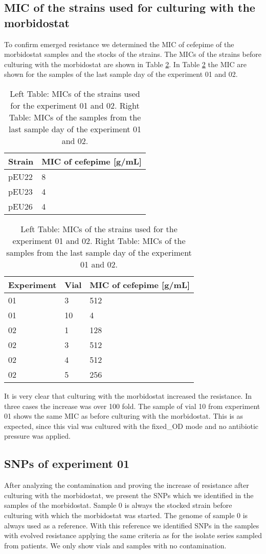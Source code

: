 \subsection{MIC of the strains used for culturing with the morbidostat}
To confirm emerged resistance we determined the MIC of cefepime of the morbidostat samples and the stocks of the strains.
The MICs of the strains before culturing with the morbidostat are shown in Table \ref{table:mics_finish}. In Table \ref{table:mics_finish} the MIC are shown for the samples of the last sample day of the experiment 01 and 02. 
\begin{table}[H]
	\begin{tabular}{|ll|}
		\hline
		Strain & MIC of cefepime [\textmu g/mL] \\ \hline
		pEU22  & 8   \\ \hline
		pEU23  & 4   \\ \hline
		pEU26  & 4   \\ \hline
	\end{tabular}
	\quad
	\begin{tabular}{|lll|}
		\hline
		Experiment & Vial & MIC of cefepime [\textmu g/mL] \\ \hline
		01         & 3    & 512                            \\ \hline
		01         & 10   & 4                              \\ \hline
		02         & 1    & 128                            \\ \hline
		02         & 3    & 512                            \\ \hline
		02         & 4    & 512                            \\ \hline
		02         & 5    & 256                            \\ \hline
	\end{tabular}
	\label{table:mics_finish}
	\caption{Left Table: MICs of the strains used for the experiment 01 and 02. Right Table: MICs of the samples from the last sample day of the experiment 01 and 02.}
It is very clear that culturing with the morbidostat increased the resistance. In three cases the increase was over 100 fold. The sample of vial 10 from experiment 01 shows the same MIC as before culturing with the morbidostat. This is as expected, since this vial was cultured with the fixed\_OD mode and no antibiotic pressure was applied. 
\end{table}
\subsection{SNPs of experiment 01}
After analyzing the contamination and proving the increase of resistance after culturing with the morbidostat, we present the SNPs which we identified in the samples of the morbidostat. Sample 0 is always the stocked strain before culturing with which the morbidostat was started. The genome of sample 0 is always used as a reference. With this reference we identified SNPs in the samples with evolved resistance applying the same criteria as for the isolate series sampled from patients. We only show vials and samples with no contamination.
